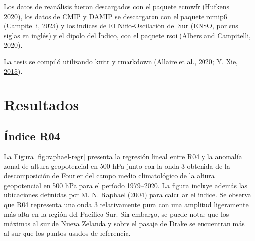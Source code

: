 \documentclass[12pt,oneside,a4paper]{reedthesis}
\begin{document}
Los datos de reanálisis fueron descargados con el paquete ecmwfr (\protect\hyperlink{ref-hufkens2020}{Hufkens, 2020}), los datos de CMIP y DAMIP se descargaron con el paquete rcmip6 (\protect\hyperlink{ref-rcmip6}{Campitelli, 2023}) y los índices de El Niño-Oscilación del Sur (ENSO, por sus siglas en inglés) y el dipolo del Índico, con el paquete rsoi (\protect\hyperlink{ref-albers2020}{Albers and Campitelli, 2020}).

La tesis se compiló utilizando knitr y rmarkdown (\protect\hyperlink{ref-allaire2020}{Allaire et al., 2020}; \protect\hyperlink{ref-xie2015}{Y. Xie, 2015}).

\hypertarget{resultados}{%
\section{Resultados}\label{resultados}}

\hypertarget{uxedndice-r04-1}{%
\subsection{Índice R04}\label{uxedndice-r04-1}}

La Figura \ref{fig:raphael-regr} presenta la regresión lineal entre R04 y la anomalía zonal de altura geopotencial en 500 hPa junto con la onda 3 obtenida de la descomposición de Fourier del campo medio climatológico de la altura geopotencial en 500 hPa para el período 1979--2020.
La figura incluye además las ubicaciones definidas por M. N. Raphael (\protect\hyperlink{ref-raphael2004}{2004}) para calcular el índice.
Se observa que R04 representa una onda 3 relativamente pura con una amplitud ligeramente más alta en la región del Pacífico Sur.
Sin embargo, se puede notar que los máximos al sur de Nueva Zelanda y sobre el pasaje de Drake se encuentran más al sur que los puntos usados de referencia.
\end{document}
